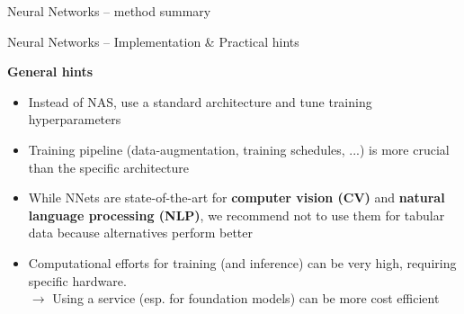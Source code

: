 \documentclass[11pt,compress,t,notes=noshow, xcolor=table]{beamer}
\newcommand{\highlight}[1]{\textcolor{hlcol}{\textbf{#1}}}
\begin{document}
\begin{frame2}{Neural Networks -- method summary}
  
\end{frame2}

\begin{frame2}
  {Neural Networks -- Implementation \& Practical hints}

\highlight{General hints}
\begin{itemize}
    \item Instead of NAS, use a standard architecture and tune training hyperparameters
    \item Training pipeline (data-augmentation, training schedules, ...) is more crucial than the specific architecture
    \item While NNets are state-of-the-art for \textbf{computer vision (CV)} and \textbf{natural language processing (NLP)}, we recommend not to use them for tabular data because alternatives perform better
    \item Computational efforts for training (and inference) can be very high, requiring specific hardware.\\
    $\rightarrow$ Using a service (esp. for foundation models) can be more cost efficient
\end{itemize}




\end{frame2}
\end{document}
